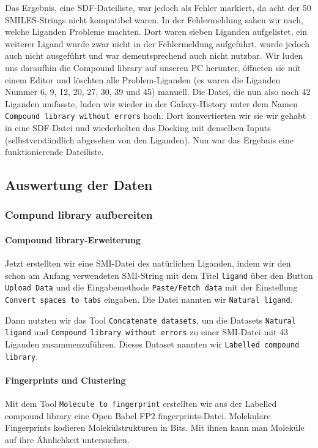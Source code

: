 \documentclass[10pt]{article}
\begin{document}
    Das Ergebnis, eine SDF-Dateiliste, war jedoch als Fehler markiert, da acht der 50 SMILES-Strings nicht kompatibel
    waren. In der Fehlermeldung sahen wir nach, welche Liganden Probleme machten. Dort waren sieben Liganden
    aufgelistet, ein weiterer Ligand wurde zwar nicht in der Fehlermeldung aufgeführt, wurde jedoch auch nicht
    ausgeführt und war dementsprechend auch nicht nutzbar. Wir luden uns daraufhin die Compound library auf unseren
    PC herunter, öffneten sie mit einem Editor und löschten alle Problem-Liganden (es waren die Liganden Nummer 6, 9,
    12, 20, 27, 30, 39 und 45) manuell. Die Datei, die nun also noch 42 Liganden umfasste, luden wir wieder in der
    Galaxy-History unter dem Namen \texttt{Compound library without errors} hoch. Dort konvertierten wir sie wir
    gehabt in
    eine SDF-Datei und wiederholten das Docking mit denselben Inputs (selbstverständlich abgesehen von den Liganden).
    Nun war das Ergebnis eine funktionierende Dateiliste.

    \subsection{Auswertung der Daten}\label{subsubsec:aufbereitung-der-daten}

    \subsubsection{Compund library aufbereiten}

    \paragraph{Compound library-Erweiterung}
    Jetzt erstellten wir eine SMI-Datei des natürlichen Liganden, indem wir den schon am Anfang verwendeten
    SMI-String mit dem Titel \texttt{ligand} über den Button \texttt{Upload Data} und die Eingabemethode
    \texttt{Paste/Fetch data} mit der
    Einstellung \texttt{Convert spaces to tabs} eingaben. Die Datei nannten wir \texttt{Natural ligand}.

    Dann nutzten wir das Tool \texttt{Concatenate datasets}, um die Datasets \texttt{Natural ligand} und
    \texttt{Compound library without
    errors} zu einer SMI-Datei mit 43 Liganden zusammenzuführen. Dieses Dataset nannten wir \texttt{Labelled compound
    library}.

    \paragraph{Fingerprints und Clustering}
    Mit dem Tool \texttt{Molecule to fingerprint} erstellten wir aus der Labelled compound library eine Open Babel FP2
    fingerprints-Datei.\cite{8, 18} Molekulare Fingerprints kodieren Molekülstrukturen in Bits. Mit ihnen
    kann man Moleküle auf
    ihre Ähnlichkeit untersuchen.
\end{document}

